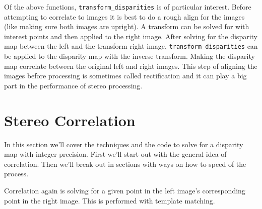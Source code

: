 Of the above functions, {\tt transform\_disparities} is of particular
interest. Before attempting to correlate to images it is best to do a
rough align for the images (like making sure both images are
upright). A transform can be solved for with interest points and then
applied to the right image. After solving for the disparity map
between the left and the transform right image, {\tt transform\_disparities}
can be applied to the disparity map with the inverse transform. Making
the disparity map correlate between the original left and right
images. This step of aligning the images before processing is
sometimes called rectification and it can play a big part in the
performance of stereo processing.

\section{Stereo Correlation}
\label{sec:stereo_correlation}

In this section we'll cover the techniques and the code to solve for a
disparity map with integer precision. First we'll start out with the
general idea of correlation. Then we'll break out in sections with
ways on how to speed of the process.

Correlation again is solving for a given point in the left image's
corresponding point in the right image. This is performed with
template matching.

